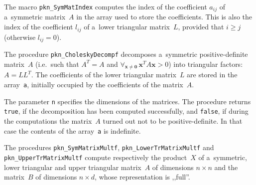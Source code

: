 \vspace{\bigskipamount}
The macro \texttt{pkn\_SymMatIndex} computes the index of the coefficient
$a_{ij}$ of a~symmetric matrix~$A$ in the array used to store the coefficients.
This is also the index of the coefficient $l_{ij}$ of a~lower triangular
matrix~$L$, provided that $i\geq j$ (otherwise $l_{ij}=0$).

\vspace{\bigskipamount}
The procedure \texttt{pkn\_CholeskyDecompf} decomposes a~symmetric
positive-definite matrix~$A$ (i.e.\ such that $A^T=A$ and
$\forall_{\bm{x}\neq\bm{0}}\,\bm{x}^TA\bm{x}>0$) into triangular factors:
$A=LL^T$. The coefficients of the lower triangular matrix~$L$ are stored
in the array~\texttt{a}, initially occupied by the coefficients of the
matrix~$A$.

The parameter \texttt{n} specifies the dimensions of the matrices.
The procedure returns \texttt{true}, if the decomposition has been
computed successfully, and \texttt{false}, if during the computations
the matrix~$A$ turned out not to be positive-definite.
In that case the contents of the array~\texttt{a}
is indefinite.

\vspace{\bigskipamount}
\begin{sloppypar}
The procedures \texttt{pkn\_SymMatrixMultf}, \texttt{pkn\_LowerTrMatrixMultf}
and \\ \texttt{pkn\_UpperTrMatrixMultf} compute respectively the product~$X$ of
a~symmetric, lower triangular and upper triangular matrix~$A$ of dimensions
$n\times n$ and the matrix~$B$ of dimensions $n\times d$, whose representation
is ,,full''.
\end{sloppypar}


